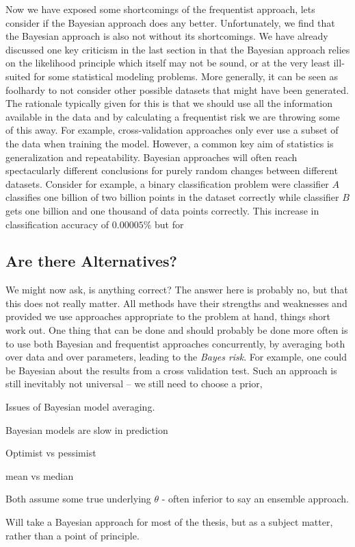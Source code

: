 Now we have exposed some shortcomings of the frequentist approach, lets consider if the Bayesian approach does any better.
Unfortunately, we find that the Bayesian approach is also not without its shortcomings.  We have already discussed one
key criticism in the last section in that the Bayesian approach relies on the likelihood principle which itself may not
be sound, or at the very least ill-suited for some statistical modeling problems.  More generally, it can be seen as
foolhardy to not consider other possible datasets that might have been generated.  The rationale typically given for
this is that we should use all the information available in the data and by calculating a frequentist risk we are throwing
some of this away.  For example, cross-validation approaches only ever use a subset of the data when training the model.
However, a common key aim of statistics is generalization and repeatability.  Bayesian approaches will often reach
spectacularly different conclusions for purely random changes between different datasets.  Consider for example, a binary
classification
problem were classifier $A$ classifies one billion of two billion points in the dataset correctly while classifier $B$
gets one billion and one thousand of data points correctly.  This increase in classification accuracy of $0.00005\%$ but
for 

\subsection{Are there Alternatives?}
\label{sec:bayes:religion:correct}

We might now ask, is anything correct?  The answer here is probably no, but that this does not really matter.  All methods
have their strengths and weaknesses and provided we use approaches appropriate to the problem at hand, things short work out.
One thing that can be done and should probably be done more often is to use both Bayesian and frequentist approaches concurrently,
by averaging both over data and over parameters, leading to the \emph{Bayes risk}.   For example, one could be Bayesian 
about the results from a cross validation test.  Such an approach is still inevitably not universal -- we still need to choose
a prior, 




Issues of Bayesian model averaging.

Bayesian models are slow in prediction

Optimist vs pessimist

mean vs median

Both assume some true underlying $\theta$ - often inferior to say an ensemble approach.

Will take a Bayesian approach for most of the thesis, but as a subject matter, rather than a point of principle.